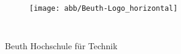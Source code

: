 


%


\thispagestyle{empty}


\begin{figure}[t]
 \centering
 \texttt{[image: abb/Beuth-Logo\_horizontal]}
~~~~~~~~~~
\end{figure}


\begin{verbatim}


\end{verbatim}

\begin{center}
\Large{Beuth Hochschule für Technik}\\
\end{center}


